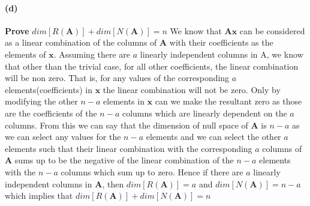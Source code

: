 \documentclass[12pt, letterpaper]{article}
\begin{document}
\paragraph{(d)} \textbf{Prove} $dim[R(\mathbf{A})] + dim[N(\mathbf{A})] = n$
\newline\newline
We know that $\mathbf{Ax}$ can be considered as a linear combination of the columns of $\mathbf{A}$ with their coefficients as the elements of $\mathbf{x}$.
Assuming there are $a$ linearly independent columns in A, we know that other than the trivial case, for all other coefficients, the linear combination will be non zero. That is, for any values of the corresponding $a$ elements(coefficients) in $\mathbf{x}$ the linear combination will not be zero. Only by modifying the other $n - a$ elements in $\mathbf{x}$ can we make the resultant zero as those are the coefficients of the $n - a$ columns which are linearly dependent on the $a$ columns.
\newline\newline
From this we can say that the dimension of null space of $\mathbf{A}$ is $n - a$ as we can select any values for the $n - a$ elements and we can select the other $a$ elements such that their linear combination with the corresponding $a$ columns of $\mathbf{A}$ sums up to be the negative of the linear combination of the $n - a$ elements with the $n - a$ columns which sum up to zero.
\newline\newline
Hence if there are $a$ linearly independent columns in $\mathbf{A}$, then $dim[R(\mathbf{A})] = a$ and $dim[N(\mathbf{A})] = n - a$ which implies that $\boxed{dim[R(\mathbf{A})] + dim[N(\mathbf{A})] = n}$
\end{document}
